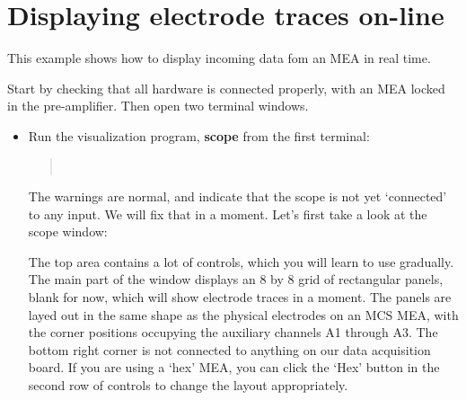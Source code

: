\documentclass[12pt,oneside]{book}
\def\gfxextn{}
\def\prog#1{{\bf #1}}
\def\cfig#1#2{\begin{center}\epsfig{file=#1\gfxextn,width=#2}\end{center}}
\begin{document}
\section{Displaying electrode traces on-line}

This example shows how to display incoming data fom an MEA in
real time. 

Start by checking that all hardware is connected properly, with an MEA
locked in the pre-amplifier. Then open two terminal windows.

\begin{itemize}
\item Run the visualization program, \prog{scope} from the first terminal:
\begin{quotation}
\uprompt~
\end{quotation}
The warnings are normal, and indicate that the scope is not yet
`connected' to any input. We will fix that in a moment. Let's first
take a look at the scope window:

\cfig{scope}{.8\textwidth}

The top area contains a lot of controls, which you will learn to use
gradually. The main part of the window displays an 8 by 8 grid of
rectangular panels, blank for now, which will show electrode traces in
a moment. The panels are layed out in the same shape as the physical
electrodes on an MCS MEA, with the corner positions occupying the
auxiliary channels A1 through A3. The bottom right corner is not
connected to anything on our data acquisition board. If you are using
a `hex' MEA, you can click the `Hex' button in the second row of
controls to change the layout appropriately.


\end{itemize}
\end{document}
